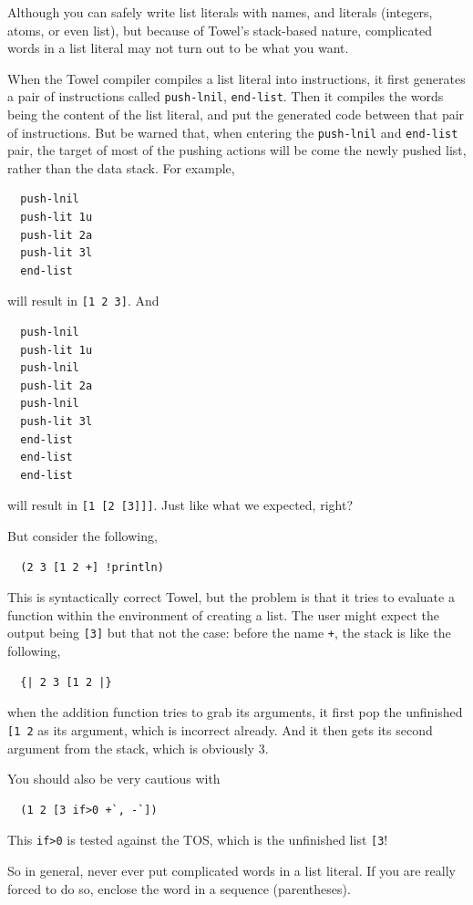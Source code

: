 \documentclass{report}
\begin{document}
\begin{mdframed}[style=warning]

Although you can safely write list literals with names, and literals (integers, atoms, or even list), but because of Towel's stack-based nature, complicated words in a list literal may not turn out to be what you want.

When the Towel compiler compiles a list literal into instructions, it first generates a pair of instructions called \texttt{push-lnil}, \texttt{end-list}. Then it compiles the words being the content of the list literal, and put the generated code between that pair of instructions. But be warned that, when entering the \texttt{push-lnil} and \texttt{end-list} pair, the target of most of the pushing actions will be come the newly pushed list, rather than the data stack. For example,

\begin{verbatim}
  push-lnil
  push-lit 1u
  push-lit 2a
  push-lit 3l
  end-list
\end{verbatim}

will result in \texttt{[1 2 3]}. And

\begin{verbatim}
  push-lnil
  push-lit 1u
  push-lnil
  push-lit 2a
  push-lnil
  push-lit 3l
  end-list
  end-list
  end-list
\end{verbatim}

will result in \texttt{[1 [2 [3]]]}. Just like what we expected, right?

But consider the following,

\begin{verbatim}
  (2 3 [1 2 +] !println)
\end{verbatim}

This is syntactically correct Towel, but the problem is that it tries to evaluate a function within the environment of creating a list. The user might expect the output being \texttt{[3]} but that not the case: before the name \texttt{+}, the stack is like the following,

\begin{verbatim}
  {| 2 3 [1 2 |}
\end{verbatim}

when the addition function tries to grab its arguments, it first pop the unfinished \texttt{[1 2} as its argument, which is incorrect already. And it then gets its second argument from the stack, which is obviously 3.

You should also be very cautious with

\begin{verbatim}
  (1 2 [3 if>0 +`, -`])
\end{verbatim}

This \texttt{if>0} is tested against the TOS, which is the unfinished list \texttt{[3}!

So in general, never ever put complicated words in a list literal. If you are really forced to do so, enclose the word in a sequence (parentheses).
\end{mdframed}
\end{document}

